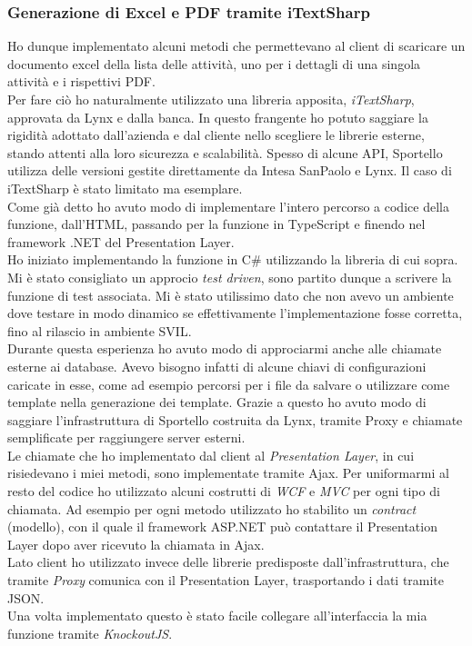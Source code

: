 \subsubsection{Generazione di Excel e PDF tramite iTextSharp}
Ho dunque implementato alcuni metodi che permettevano al client di scaricare un documento excel della lista delle attività, uno per i dettagli di una singola attività e i rispettivi PDF. \\
Per fare ciò ho naturalmente utilizzato una libreria apposita, \textit{iTextSharp}, approvata da Lynx e dalla banca. In questo frangente ho potuto saggiare la rigidità adottato dall'azienda e dal cliente nello scegliere le librerie esterne, stando attenti alla loro sicurezza e scalabilità. Spesso di alcune API, Sportello utilizza delle versioni gestite direttamente da Intesa SanPaolo e Lynx. Il caso di iTextSharp è stato limitato ma esemplare. \\
Come già detto ho avuto modo di implementare l'intero percorso a codice della funzione, dall'HTML, passando per la funzione in TypeScript e finendo nel framework .NET del Presentation Layer. \\
Ho iniziato implementando la funzione in C\# utilizzando la libreria di cui sopra. Mi è stato consigliato un approcio \textit{test driven}, sono partito dunque a scrivere la funzione di test associata. Mi è stato utilissimo dato che non avevo un ambiente dove testare in modo dinamico se effettivamente l'implementazione fosse corretta, fino al rilascio in ambiente SVIL. \\
Durante questa esperienza ho avuto modo di approciarmi anche alle chiamate esterne ai database. Avevo bisogno infatti di alcune chiavi di configurazioni caricate in esse, come ad esempio percorsi per i file da salvare o utilizzare come template nella generazione dei template. Grazie a questo ho avuto modo di saggiare l'infrastruttura di Sportello costruita da Lynx, tramite Proxy e chiamate semplificate per raggiungere server esterni. \\
Le chiamate che ho implementato dal client al \textit{Presentation Layer}, in cui risiedevano i miei metodi, sono implementate tramite Ajax. Per uniformarmi al resto del codice ho utilizzato alcuni costrutti di \textit{WCF} e \textit{MVC} per ogni tipo di chiamata. Ad esempio per ogni metodo utilizzato ho stabilito un \textit{contract} (modello), con il quale il framework ASP.NET può contattare il Presentation Layer dopo aver ricevuto la chiamata in Ajax. \\
Lato client ho utilizzato invece delle librerie predisposte dall'infrastruttura, che tramite \textit{Proxy} comunica con il Presentation Layer, trasportando i dati tramite JSON. \\
Una volta implementato questo è stato facile collegare all'interfaccia la mia funzione tramite \textit{KnockoutJS}.

